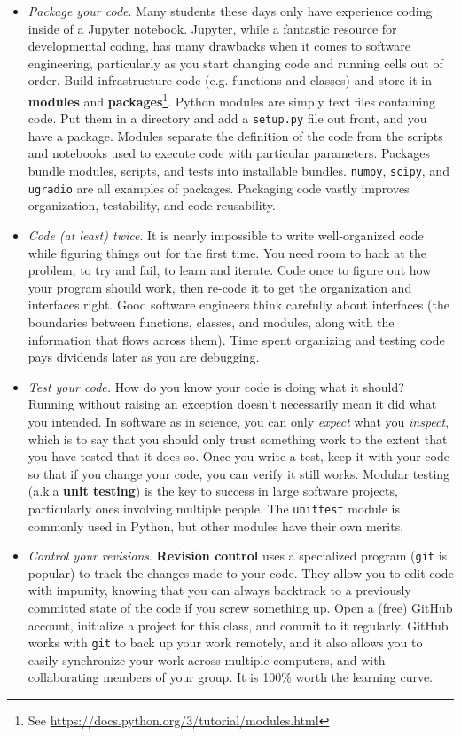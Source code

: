 \documentclass[11pt,preprint]{aastex}
\begin{document}
\begin{itemize}

\item {\it Package your code}.
Many students these days only have experience coding inside of a Jupyter 
notebook. Jupyter, while a fantastic resource for developmental coding,
has many drawbacks when it comes to software engineering, particularly as
you start changing code and running cells out of order.
Build infrastructure code (e.g. functions and
classes) and store it in {\bf modules} and
{\bf packages}\footnote{See 
\url{https://docs.python.org/3/tutorial/modules.html}}.
Python modules are simply text files containing code. Put them in
a directory and add a {\tt setup.py} file out front, and you have a
package.
Modules separate the definition of the code from the scripts and notebooks 
used to execute code with particular parameters. Packages bundle modules,
scripts, and tests into installable bundles. {\tt numpy}, {\tt scipy},
and {\tt ugradio} are all examples of packages.
Packaging code vastly improves
organization, testability, and code reusability.

\item {\it Code (at least) twice}. It is nearly impossible to write 
well-organized code while figuring
things out for the first time. You need room to hack at the problem, to try and fail, to learn and iterate.
Code once to figure out how your program should work, then
re-code it to get the organization and interfaces right. Good software
engineers think carefully about interfaces (the boundaries between
functions, classes, and modules, along with the information that flows
across them). Time spent organizing and testing code pays
dividends later as you are debugging.

\item {\it Test your code.} How do you know your code is doing what it should? Running
without raising an exception doesn't necessarily mean it did what you intended. In software as in science,
you can only {\it expect} what you {\it inspect}, which is to say that
you should only trust something work to the extent that you have 
tested that it does so.
Once you write a test, keep it with your code so that if you change your
code, you can verify it still works.
Modular testing (a.k.a {\bf unit testing}) is the key to success in large
software projects, particularly ones involving multiple people.
The {\tt unittest} module is 
commonly used in Python, but other modules have their own merits.

\item{\it Control your revisions}. {\bf Revision control} uses a specialized program ({\tt git} is popular) to
track the changes made to your code. They allow you to edit code with 
impunity, knowing that you can always backtrack to a previously committed
state of the code if you screw something up.
Open a (free) GitHub account, initialize a project
for this class, and commit to it regularly. GitHub works with 
{\tt git} to back up your work remotely, and it also 
allows you to easily synchronize your work across multiple computers,
and with collaborating members of your group.  It is 100\% worth the 
learning curve.

\end{itemize}
\end{document}
